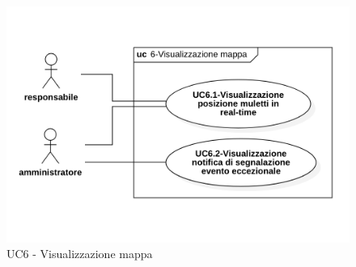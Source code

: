 \begin{figure}[H]
	\centering
	\includegraphics[scale=0.52]{res/images/uc6.png}
	\caption{UC6 - Visualizzazione mappa}
\end{figure}

